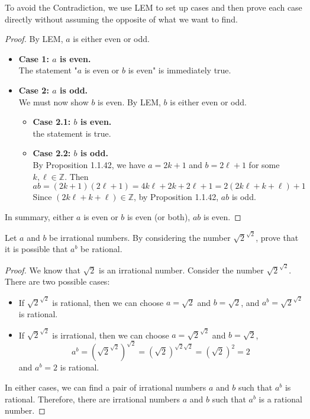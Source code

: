 \begin{solutions*}
To avoid the Contradiction, we use LEM to set up cases and then prove each case directly without assuming the opposite of what we want to find.
\begin{proof}
    By LEM, $a$ is either even or odd.
    \begin{itemize}
        \item \textbf{Case 1: $a$ is even.}\\
          The statement "$a$ is even or $b$ is even" is immediately true.
        \item \textbf{Case 2: $a$ is odd.}\\
          We must now show $b$ is even. By LEM, $b$ is either even or odd.
          \begin{itemize}
            \item \textbf{Case 2.1: $b$ is even.}\\
                the statement is true.
            \item \textbf{Case 2.2: $b$ is odd.}\\
                By Proposition 1.1.42, we have $a = 2k+1$ and $b = 2\ell+1$ for some $k, \ell \in \mathbb{Z}$. Then
                \[ab = (2k+1)(2\ell+1) = 4k\ell + 2k + 2\ell + 1 = 2(2k\ell + k + \ell) + 1\]
                Since $(2k\ell + k + \ell) \in \mathbb{Z}$, by Proposition 1.1.42, $ab$ is odd. 
          \end{itemize}
    \end{itemize}
    In summary, either $a$ is even or $b$ is even (or both), $ab$ is even.
\end{proof}
\end{solutions*}

\begin{exercise}
Let $a$ and $b$ be irrational numbers. By considering the number $\sqrt{2}^{\sqrt{2}}$, prove that it is possible that $a^b$ be rational.
\end{exercise}

\begin{solutions*}
    \fixlistskip
    \begin{proof}
    We know that $\sqrt{2}$ is an irrational number. Consider the number $\sqrt{2}^{\sqrt{2}}$. There are two possible cases:
    \begin{itemize}
    \item If $\sqrt{2}^{\sqrt{2}}$ is rational, then we can choose $a = \sqrt{2}$ and $b = \sqrt{2}$, and $a^b = \sqrt{2}^{\sqrt{2}}$ is rational.
    \item If $\sqrt{2}^{\sqrt{2}}$ is irrational, then we can choose $a = \sqrt{2}^{\sqrt{2}}$ and $b = \sqrt{2}$,
    \[
    a^b = \left(\sqrt{2}^{\sqrt{2}}\right)^{\sqrt{2}} = \left(\sqrt{2}\right)^{\sqrt{2} \sqrt{2}} = \left(\sqrt{2}\right)^2 = 2
    \]
    and $a^b = 2$ is rational.
    \end{itemize}
    In either cases, we can find a pair of irrational numbers $a$ and $b$ such that $a^b$ is rational. Therefore, there are irrational numbers $a$ and $b$ such that $a^b$ is a rational number.
    \end{proof}
\end{solutions*}
